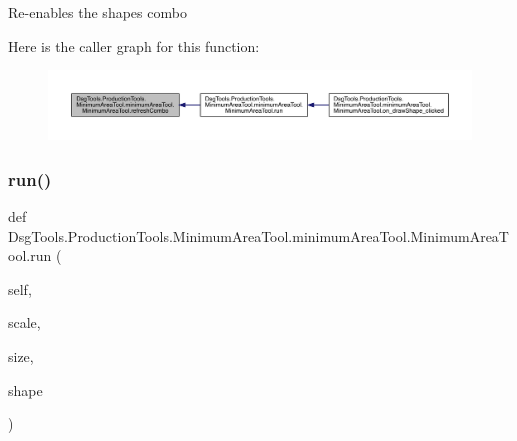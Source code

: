 \begin{DoxyVerb}Re-enables the shapes combo
\end{DoxyVerb}
 Here is the caller graph for this function\+:
\nopagebreak
\begin{figure}[H]
\begin{center}
\leavevmode
\includegraphics[width=350pt]{class_dsg_tools_1_1_production_tools_1_1_minimum_area_tool_1_1minimum_area_tool_1_1_minimum_area_tool_aae4bdecc9b1109f79fae162465368f69_icgraph}
\end{center}
\end{figure}
\mbox{\label{class_dsg_tools_1_1_production_tools_1_1_minimum_area_tool_1_1minimum_area_tool_1_1_minimum_area_tool_a84120b6ed248ccb405109998d660698a}} 
\subsubsection{\texorpdfstring{run()}{run()}}
{\footnotesize\ttfamily def Dsg\+Tools.\+Production\+Tools.\+Minimum\+Area\+Tool.\+minimum\+Area\+Tool.\+Minimum\+Area\+Tool.\+run (\begin{DoxyParamCaption}\item[{}]{self,  }\item[{}]{scale,  }\item[{}]{size,  }\item[{}]{shape }\end{DoxyParamCaption})}

